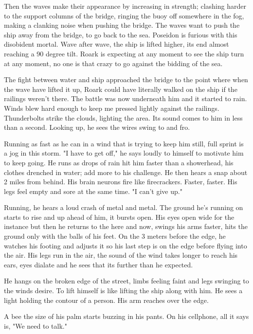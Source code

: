         Then the waves make their appearance by increasing in strength; clashing harder to the support columns of the bridge, ringing the buoy
    off somewhere in the fog, making a clanking noise when pushing the bridge. The waves want to push the ship away from the bridge, to go back
    to the sea. Poseidon is furious with this disobident mortal. Wave after wave, the ship is lifted higher, its end almost reaching a 90 degree
    tilt. Roark is expecting at any moment to see the ship turn at any moment, no one is that crazy to go against the bidding of the sea.

        The fight between water and ship approached the bridge to the point where when the wave have lifted it up, Roark could have literally
    walked on the ship if the railings weren't there. The battle was now underneath him and it started to rain. Winds blew hard enough to keep
    me pressed lightly against the railings. Thunderbolts strike the clouds, lighting the area. Its sound comes to him in less than a second.
    Looking up, he sees the wires swing to and fro.

        Running as fast as he can in a wind that is trying to keep him still, full sprint is a jog in this storm. "I have to get off," he says
    loudly to himself to motivate him to keep going. He runs as drops of rain hit him faster than a showerhead, his clothes drenched in water;
    add more to his challenge. He then hears a snap about 2 miles from behind. His brain neurons fire like firecrackers. Faster, faster. His
    legs feel empty and sore at the same time. "I can't give up." 

        Running, he hears a loud crash of metal and metal. The ground he's running on starts to rise and up ahead of him, it bursts open. His
    eyes open wide for the instance but then he returns to the here and now, swings his arms faster, hits the ground only with the balls of
    his feet. On the 3 meters before the edge, he watches his footing and adjusts it so his last step is on the edge before flying into the
    air. His legs run in the air, the sound of the wind takes longer to reach his ears, eyes dialate and he sees that its further than he 
    expected.

        He hangs on the broken edge of the street, limbs feeling faint and legs swinging to the winds desire. To lift himself is like lifting
    the ship along with him. He sees a light holding the contour of a person. His arm reaches over the edge.

        A bee the size of his palm starts buzzing in his pants. On his cellphone, all it says is, "We need to talk."

